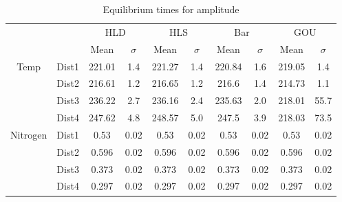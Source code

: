 \begin{table}[h]
\centering
\caption{Equilibrium times for amplitude}
\label{table:5}
\begin{tabular}{cccccccccc}
\toprule
 &  & \multicolumn{2}{c}{HLD} & \multicolumn{2}{c}{HLS} & \multicolumn{2}{c}{Bar} & \multicolumn{2}{c}{GOU} \\
 &  & Mean & $\sigma$ & Mean & $\sigma$ & Mean & $\sigma$ & Mean & $\sigma$ \\
\midrule
\multirow[c]{4}{*}{Temp} & Dist1 & 221.01 & 1.4 & 221.27 & 1.4 & 220.84 & 1.6 & 219.05 & 1.4 \\
 & Dist2 & 216.61 & 1.2 & 216.65 & 1.2 & 216.6 & 1.4 & 214.73 & 1.1 \\
 & Dist3 & 236.22 & 2.7 & 236.16 & 2.4 & 235.63 & 2.0 & 218.01 & 55.7 \\
 & Dist4 & 247.62 & 4.8 & 248.57 & 5.0 & 247.5 & 3.9 & 218.03 & 73.5 \\
\multirow[c]{4}{*}{Nitrogen} & Dist1 & 0.53 & 0.02 & 0.53 & 0.02 & 0.53 & 0.02 & 0.53 & 0.02 \\
 & Dist2 & 0.596 & 0.02 & 0.596 & 0.02 & 0.596 & 0.02 & 0.596 & 0.02 \\
 & Dist3 & 0.373 & 0.02 & 0.373 & 0.02 & 0.373 & 0.02 & 0.373 & 0.02 \\
 & Dist4 & 0.297 & 0.02 & 0.297 & 0.02 & 0.297 & 0.02 & 0.297 & 0.02 \\
\bottomrule
\end{tabular}
\end{table}
